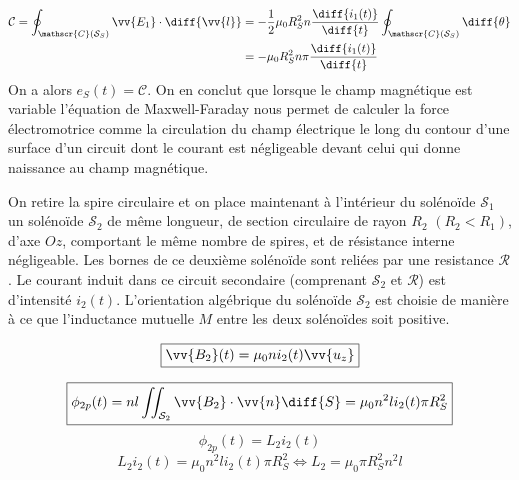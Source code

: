 
\begin{equation}
  \begin{split}
    \mathcal{C} = \oint_{\mathscr{C}(\mathcal{S}_S)} \vv{E_1} \cdot \diff{\vv{l}}
    &= - \frac{1}{2} \mu_0 R_S^2 n \frac{\diff{i_1 (t)}}{\diff{t}} \oint_{\mathscr{C}(\mathcal{S}_S)} \diff{\theta}\\
    &= - \mu_0 R_S^2 n \pi \frac{\diff{i_1 (t)}}{\diff{t}}
  \end{split}
\end{equation}
On a alors $e_S(t) = \mathcal{C}$. On en conclut que lorsque le champ magnétique est variable l'équation de Maxwell-Faraday nous permet de calculer la force électromotrice comme la circulation du champ électrique le long du contour d'une surface d'un circuit dont le courant est négligeable devant celui qui donne naissance au champ magnétique.


On retire la spire circulaire et on place maintenant à l'intérieur du solénoïde $\mathcal{S}_1$ un solénoïde $\mathcal{S}_2$ de même longueur, de section circulaire de rayon $R_2$ $\left( R_2 < R_1 \right)$, d'axe $Oz$, comportant le même nombre de spires, et de résistance interne négligeable. Les bornes de ce deuxième solénoïde sont reliées par une resistance $\mathcal{R}$. Le courant induit dans ce circuit secondaire (comprenant $\mathcal{S}_2$ et $\mathcal{R}$) est d'intensité $i_2 (t)$. L'orientation algébrique du solénoïde $\mathcal{S}_2$ est choisie de manière à ce que l'inductance mutuelle $M$ entre les deux solénoïdes soit positive.


\begin{equation}
  \boxed{\vv{B_2} (t) = \mu_0 n i_2(t) \vv{u_z}}
\end{equation}


\begin{equation}
  \boxed{\phi_{2p} (t) = nl\iint_{\mathcal{S}_2} \vv{B_2} \cdot \vv{n} \diff{S} = \mu_0 n^2 l i_2 (t) \pi R_S^2}
\end{equation}
\begin{equation}
  \phi_{2p} (t) = L_2 i_2 (t)
\end{equation}
\begin{equation}
  L_2 i_2 (t) = \mu_0 n^2 l i_2 (t) \pi R_S^2 \iff \boxed{L_2 = \mu_0 \pi R_S^2 n^2 l}
\end{equation}

